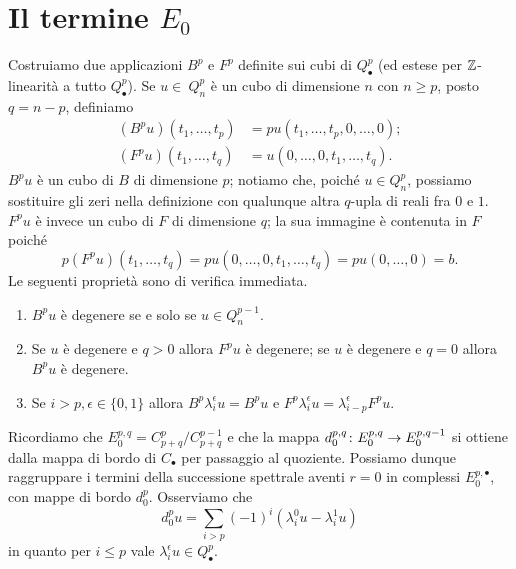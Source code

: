 \section{Il termine \texorpdfstring{$E_0$}{E0}}
Costruiamo due applicazioni $B^p$ e $F^p$ definite sui cubi di $Q^p_\bullet$ (ed estese per $\mathbb{Z}$-linearità a tutto $Q^p_\bullet$). Se $u\in\ Q^p_n$ è un cubo di dimensione $n$ con $n\ge p$, posto $q=n-p$, definiamo
\begin{align*}
(B^pu)(t_1,\ldots,t_p)&=pu(t_1,\ldots,t_p,0,\ldots,0);\\
(F^pu)(t_1,\ldots,t_q)&=u(0,\ldots,0,t_1,\ldots,t_q).
\end{align*}
$B^pu$ è un cubo di $B$ di dimensione $p$; notiamo che, poiché $u\in Q^p_n$, possiamo sostituire gli zeri nella definizione con qualunque altra $q$-upla di reali fra $0$ e $1$. $F^pu$ è invece un cubo di $F$ di dimensione $q$; la sua immagine è contenuta in $F$ poiché
$$
p(F^pu)(t_1,\ldots,t_q)=pu(0,\ldots,0,t_1,\ldots,t_q)=pu(0,\ldots,0)=b.
$$
Le seguenti proprietà sono di verifica immediata.
\begin{enumerate}
\item\label{spectral-sequence-of-fibration:pr1} $B^pu$ è degenere se e solo se $u\in Q^{p-1}_n$.
\item\label{spectral-sequence-of-fibration:pr2} Se $u$ è degenere e $q>0$ allora $F^pu$ è degenere; se $u$ è degenere e $q=0$ allora $B^pu$ è degenere.
\item\label{spectral-sequence-of-fibration:pr3} Se $i>p,\epsilon\in\{0,1\}$ allora $B^p\lambda^\epsilon_iu=B^pu$ e $F^p\lambda^\epsilon_iu=\lambda^\epsilon_{i-p}F^pu$.
\end{enumerate}

Ricordiamo che $E^{p,q}_0=C^p_{p+q}/C^{p-1}_{p+q}$ e che la mappa $d^{p,q}_0\colon E^{p,q}_0\to E^{p,q-1}_0$ si ottiene dalla mappa di bordo di $C_\bullet$ per passaggio al quoziente. Possiamo dunque raggruppare i termini della successione spettrale aventi $r=0$ in complessi $E^{p,\bullet}_0$, con mappe di bordo $d^p_0$. Osserviamo che
$$
d^p_0u=\sum_{i>p}(-1)^i(\lambda^0_iu-\lambda^1_iu)
$$
in quanto per $i\le p$ vale $\lambda^\epsilon_iu\in Q^p_\bullet$.

